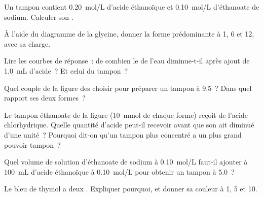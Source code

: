 \begin{exercise}[$\star\star$]\label{exo:g12:buffers-predominance:8}
Un tampon contient \qty{0.20}{mol/L} d'acide éthanoïque et
\qty{0.10}{mol/L} d'éthanoate de sodium. Calculer son .
\end{exercise}

\begin{exercise}[$\star\star$]\label{exo:g12:buffers-predominance:9}
À l'aide du diagramme de la glycine, donner la forme prédominante à 
1, 6 et 12, avec sa charge.
\end{exercise}

\begin{exercise}[$\star\star$]\label{exo:g12:buffers-predominance:10}
Lire les courbes de réponse~: de combien le  de l'eau diminue-t-il
après ajout de
\qty{1.0}{mL} d'acide~? Et celui du tampon~?
\end{exercise}

\begin{exercise}[$\star\star$]\label{exo:g12:buffers-predominance:11}
Quel couple de la figure des  choisir pour
préparer un tampon à  9.5~? Dans quel rapport  ses deux
formes~?
\end{exercise}

\begin{exercise}[$\star\star\star$]\label{exo:g12:buffers-predominance:12}
Le tampon éthanoate de la figure (\qty{10}{mmol} de chaque forme) reçoit
de l'acide chlorhydrique. Quelle quantité d'acide peut-il recevoir avant
que son  ait diminué d'une unité~? Pourquoi dit-on qu'un tampon plus
concentré a un plus grand pouvoir tampon~?
\end{exercise}

\begin{exercise}[$\star\star\star$]\label{exo:g12:buffers-predominance:13}
Quel volume de solution d'éthanoate de sodium à \qty{0.10}{mol/L} faut-il
ajouter à \qty{100}{mL} d'acide éthanoïque à \qty{0.10}{mol/L} pour
obtenir un tampon à  5.0~?
\end{exercise}

\begin{exercise}[$\star\star\star$]\label{exo:g12:buffers-predominance:14}
Le bleu de thymol a deux . Expliquer pourquoi, et donner
sa couleur à  1, 5 et 10.
\end{exercise}

